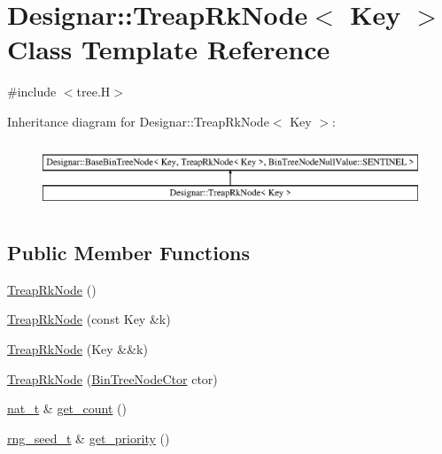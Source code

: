 \hypertarget{class_designar_1_1_treap_rk_node}{}\section{Designar\+:\+:Treap\+Rk\+Node$<$ Key $>$ Class Template Reference}
\label{class_designar_1_1_treap_rk_node}


{\ttfamily \#include $<$tree.\+H$>$}

Inheritance diagram for Designar\+:\+:Treap\+Rk\+Node$<$ Key $>$\+:\begin{figure}[H]
\begin{center}
\leavevmode
\includegraphics[height=2.000000cm]{class_designar_1_1_treap_rk_node}
\end{center}
\end{figure}
\subsection*{Public Member Functions}
\begin{DoxyCompactItemize}
\item 
\hyperlink{class_designar_1_1_treap_rk_node_a477ff390f32fe63244a0d69fb29fe72d}{Treap\+Rk\+Node} ()
\item 
\hyperlink{class_designar_1_1_treap_rk_node_af478d4d739e9f7cacf8337421f3dabcb}{Treap\+Rk\+Node} (const Key \&k)
\item 
\hyperlink{class_designar_1_1_treap_rk_node_a81c5eee2937311cfee5b30a03cd16a04}{Treap\+Rk\+Node} (Key \&\&k)
\item 
\hyperlink{class_designar_1_1_treap_rk_node_aeac25432a807225359883033f50404eb}{Treap\+Rk\+Node} (\hyperlink{namespace_designar_a679bc99fd69a3601faa5d6d47f865106}{Bin\+Tree\+Node\+Ctor} ctor)
\item 
\hyperlink{namespace_designar_aa72662848b9f4815e7bf31a7cf3e33d1}{nat\+\_\+t} \& \hyperlink{class_designar_1_1_treap_rk_node_a4396d6cb73dc8df8cdae3a94565995ef}{get\+\_\+count} ()
\item 
\hyperlink{namespace_designar_ad621b5646d45288c5d6a1e1dfe7531a8}{rng\+\_\+seed\+\_\+t} \& \hyperlink{class_designar_1_1_treap_rk_node_add770a59cfec151c17ac9f665d3ceb2f}{get\+\_\+priority} ()
\end{DoxyCompactItemize}
